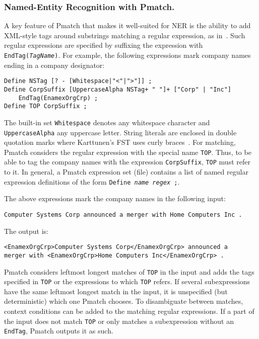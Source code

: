 \documentclass{llncs}
\begin{document}
\subsubsection{Named-Entity Recognition with Pmatch.}
\label{pmatch_for_ner}

A key feature of Pmatch that makes it well-suited for NER is the ability
to add XML-style tags around substrings matching a regular expression,
as in~\cite{karttunen/2011}. Such regular expressions are
specified by suffixing the expression with
\texttt{EndTag(\textit{TagName})}. For example, the following
expressions mark company names ending in a company designator:

\begin{verbatim}
Define NSTag [? - [Whitespace|"<"|">"]] ;
Define CorpSuffix [UppercaseAlpha NSTag+ " "]+ ["Corp" | "Inc"]
    EndTag(EnamexOrgCrp) ;
Define TOP CorpSuffix ;
\end{verbatim}

\begin{sloppypar}
\noindent
The built-in set \texttt{Whitespace} denotes any whitespace character
and \texttt{UppercaseAlpha} any uppercase letter. String literals are
enclosed in double quotation marks where Karttunen's FST uses curly
braces~\cite{karttunen/2011}.
For matching, Pmatch considers the regular expression with the special
name \texttt{TOP}. Thus, to be able to tag the company names with the
expression \texttt{CorpSuffix}, \texttt{TOP} must refer to it.
In general, a Pmatch expression set (file) contains a list of named
regular expression definitions of the form \texttt{Define
  \textit{name} \textit{regex} ;}.
\end{sloppypar}

The above expressions mark the company names in the following input:
\begin{verbatim}
Computer Systems Corp announced a merger with Home Computers Inc .
\end{verbatim}
\noindent
The output is:
\begin{verbatim}
<EnamexOrgCrp>Computer Systems Corp</EnamexOrgCrp> announced a
merger with <EnamexOrgCrp>Home Computers Inc</EnamexOrgCrp> .
\end{verbatim}

Pmatch considers leftmost longest matches of \texttt{TOP} in the input
and adds the tags specified in \texttt{TOP} or the expressions to
which \texttt{TOP} refers. If several subexpressions have the same leftmost
longest match in the input, it is unspecified (but deterministic)
which one Pmatch
chooses. To disambiguate between matches, context conditions can be
added to the matching regular expressions.
If a part of the input does not match \texttt{TOP} or only matches a
subexpression without an \texttt{EndTag},
Pmatch outputs it as such.
\end{document}
